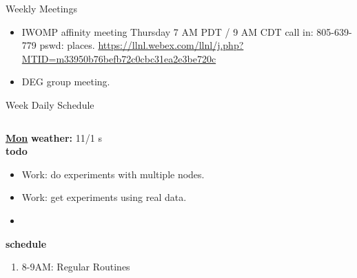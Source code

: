 \begin{columns}
\begin{column}{0.6\linewidth}
      \begin{block}{Weekly Meetings}
        \begin{itemize}
          \tiny \item \tiny IWOMP affinity meeting Thursday 7 AM PDT / 9 AM
          CDT call in: 805-639-779 pswd: places. \url{https://llnl.webex.com/llnl/j.php?MTID=m33950b76befb72c0cbc31ea2e3be720c}
        \item \tiny DEG group meeting.  
        \end{itemize}
      \end{block} 
      \begin{block}{Week Daily Schedule}
        \begin{columns}
          \begin{column}{0.14\textwidth}{\small \underline{\bf Mon}}
            {\tiny \bf {\tiny weather:} } {\tiny 11/1 s} \\ 
            {\tiny \bf {\tiny todo}}\\ 
            \begin{itemize}
              \tiny \item \tiny Work: do experiments with multiple nodes. 
            \item \tiny Work: get experiments using real data.  
            \item \tiny 
            \end{itemize}
                {\small  \bf schedule}\\
                \begin{enumerate} 
                  \tiny \item \tiny 8-9AM: Regular Routines 
                \end{enumerate}
          \end{column}


\end{columns}
\end{block}
\end{column}
\end{columns}
